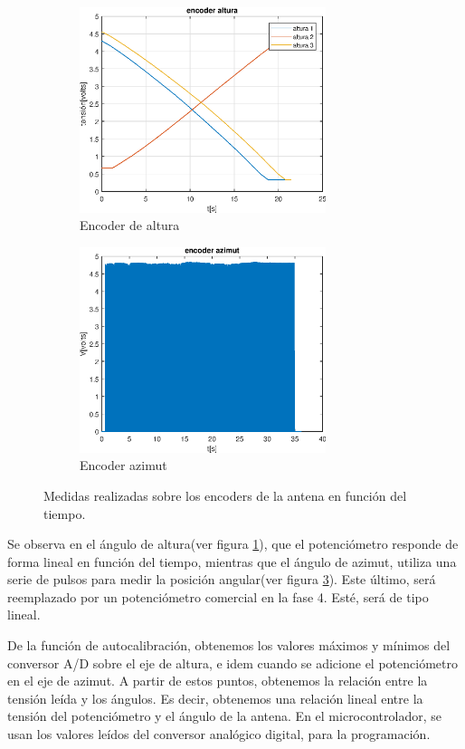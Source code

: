\begin{figure}[ht]
    \hspace{-10mm}
	\begin{subfigure}[t]{0.5\textwidth}
		\includegraphics[width=\textwidth,height=6cm]{medidas_cenit} 
		\caption{Encoder de altura} 
		\label{subfig:altura} 
	\end{subfigure}
	\hspace{10mm}	
	\begin{subfigure}[t]{0.5\textwidth}
		\includegraphics[width=\textwidth,height=6cm]{medidas_azimut}
		\caption{Encoder azimut}  
		\label{subfig:azimut} 
	\end{subfigure}
	\caption{Medidas realizadas sobre los encoders de la antena en función del tiempo.}
\end{figure}


Se observa en el ángulo de altura(ver figura \ref{subfig:altura}), que el potenciómetro responde de forma lineal en función del tiempo, mientras que el ángulo de azimut, utiliza una serie de pulsos para medir la posición angular(ver figura  \ref{subfig:azimut}). Este último, será reemplazado por un potenciómetro comercial en la fase 4. Esté, será de tipo lineal. 

De la función de autocalibración, obtenemos los valores máximos y mínimos del conversor A/D sobre el eje de altura, e idem cuando se adicione el potenciómetro en el eje de azimut. A partir de estos puntos, obtenemos la relación entre la tensión leída y los ángulos. Es decir, obtenemos una relación lineal entre la tensión del potenciómetro y el ángulo de la antena. En el microcontrolador, se usan los valores leídos del conversor analógico digital, para la programación.

